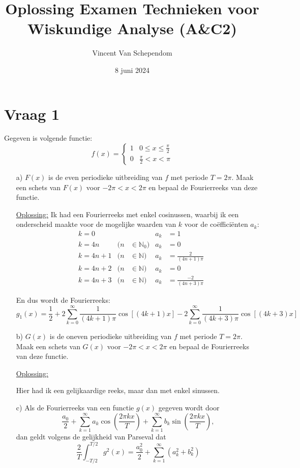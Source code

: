 \documentclass[kulak]{kulakarticle} %
\title{Oplossing Examen Technieken voor Wiskundige Analyse (A\&C2)}
\author{Vincent Van Schependom}
\date{8 juni 2024}
\newcommand{\N}{\mathbb{N}}
\begin{document}
\maketitle

\section*{Vraag 1}

Gegeven is volgende functie:
\[f(x)=\begin{cases}
	1 & 0 \leq x \leq \frac{\pi}{2} \\
	0 & \frac{\pi}{2} < x < \pi
\end{cases} \]

\begin{enumerate}
	\item[a)] \(F(x)\) is de even periodieke uitbreiding van \(f\) met periode \(T=2\pi\). Maak een schets van \(F(x)\) voor \(-2\pi < x <2\pi\) en bepaal de Fourierreeks van deze functie.

	\underline{Oplossing:}
	Ik had een Fourierreeks met enkel cosinussen, waarbij ik een onderscheid maakte voor de mogelijke waarden van \(k\) voor de coëfficiënten \(a_k\):
	\begin{align*}
		 & k=0    &    &          & a_k&=1                   \\
		 & k=4n   & (n & \in\N_0) & a_k&=0                   \\
		 & k=4n+1 & (n & \in\N)   & a_k&=\frac{2}{(4n+1)\pi} \\
		 & k=4n+2 & (n & \in\N)   & a_k&=0                   \\
		 & k=4n+3 & (n & \in\N)   & a_k&=\frac{-2}{(4n+3)\pi}
	\end{align*}

	En dus wordt de Fourierreeks:
	\[g_1(x) = \frac{1}{2} + 2\sum_{k=0}^{\infty}\frac{1}{(4k+1)\pi}\cos\left[(4k+1)x\right] - 2\sum_{k=0}^{\infty}\frac{1}{(4k+3)\pi}\cos\left[(4k+3)x\right]\]

	\item[b)] \(G(x)\) is de oneven periodieke uitbreiding van \(f\) met periode \(T=2\pi\). Maak een schets van \(G(x)\) voor \(-2\pi < x <2\pi\) en bepaal de Fourierreeks van deze functie.

	\underline{Oplossing:}

	Hier had ik een gelijkaardige reeks, maar dan met enkel sinussen.

	\item[c)] Als de Fourierreeks van een functie \(g(x)\) gegeven wordt door
	\[ \frac{a_0}{2} + \sum_{k=1}^\infty{a_k\cos\left(\frac{2\pi kx}{T}\right)}
	+ \sum_{k=1}^\infty{b_k\sin\left(\frac{2\pi kx}{T}\right)}, \]
	dan geldt volgens de gelijkheid van Parseval dat
	\[ \frac{2}{T}\int_{-T/2}^{T/2}g^2(x)= \frac{a_0^2}{2} + \sum_{k=1}^\infty{(a_k^2+b_k^2)} \]


\end{enumerate}
\end{document}
